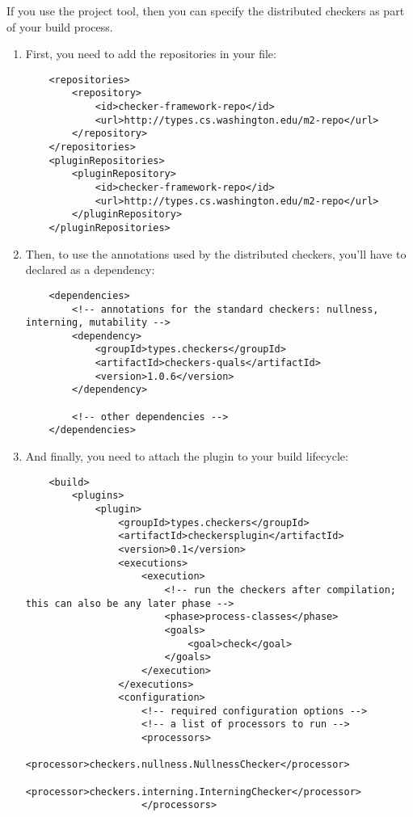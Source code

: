 If you use the  project tool,
then you can specify the distributed checkers as part of your build
process.

\begin{enumerate}

\item First, you need to add the repositories in your  file:

\begin{Verbatim}
    <repositories>
        <repository>
            <id>checker-framework-repo</id>
            <url>http://types.cs.washington.edu/m2-repo</url>
        </repository>
    </repositories>
    <pluginRepositories>
        <pluginRepository>
            <id>checker-framework-repo</id>
            <url>http://types.cs.washington.edu/m2-repo</url>
        </pluginRepository>
    </pluginRepositories>
\end{Verbatim}

\item Then, to use the annotations used by the distributed checkers, you'll
have to declared as a dependency:

\begin{Verbatim}
    <dependencies>
        <!-- annotations for the standard checkers: nullness, interning, mutability -->
        <dependency>
            <groupId>types.checkers</groupId>
            <artifactId>checkers-quals</artifactId>
            <version>1.0.6</version>
        </dependency>

        <!-- other dependencies -->
    </dependencies>
\end{Verbatim}

\item And finally, you need to attach the plugin to your build lifecycle:

\begin{Verbatim}
    <build>
        <plugins>
            <plugin>
                <groupId>types.checkers</groupId>
                <artifactId>checkersplugin</artifactId>
                <version>0.1</version>
                <executions>
                    <execution>
                        <!-- run the checkers after compilation; this can also be any later phase -->
                        <phase>process-classes</phase>
                        <goals>
                            <goal>check</goal>
                        </goals>
                    </execution>
                </executions>
                <configuration>
                    <!-- required configuration options -->
                    <!-- a list of processors to run -->
                    <processors>
                        <processor>checkers.nullness.NullnessChecker</processor>
                        <processor>checkers.interning.InterningChecker</processor>
                    </processors>



\end{Verbatim}
\end{enumerate}
